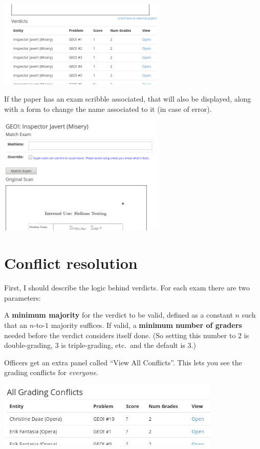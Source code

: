 \begin{center}
	\includegraphics[width=0.6\textwidth]{images/viewpaper2.png}
\end{center}

If the paper has an exam scribble associated,
that will also be displayed,
along with a form to change the name associated to it
(in case of error).

\begin{center}
	\includegraphics[width=0.6\textwidth]{images/viewpaper1.png}
\end{center}

\section{Conflict resolution}
First, I should describe the logic behind verdicts.
For each exam there are two parameters:
\begin{itemize}
	\ii A \textbf{minimum majority} for the verdict to be valid,
	defined as a constant $n$ such that an $n$-to-$1$ majority suffices.
	\ii If valid, a \textbf{minimum number of graders} needed before
	the verdict considers itself done.
	(So setting this number to $2$ is double-grading,
	$3$ is triple-grading, etc.\ and the default is $3$.)
\end{itemize}

Officers get an extra panel called ``View All Conflicts''.
This lets you see the grading conflicts for \emph{everyone}.

\begin{center}
	\includegraphics[width=0.8\textwidth]{images/all-conflict.png}
\end{center}

